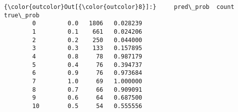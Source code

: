 \documentclass[11pt]{article}
\begin{document}
\begin{Verbatim}[commandchars=\\\{\}]
{\color{outcolor}Out[{\color{outcolor}8}]:}     pred\_prob  count  true\_prob
        0         0.0   1806   0.028239
        1         0.1    661   0.024206
        2         0.2    250   0.044000
        3         0.3    133   0.157895
        4         0.8     78   0.987179
        5         0.4     76   0.394737
        6         0.9     76   0.973684
        7         1.0     69   1.000000
        8         0.7     66   0.909091
        9         0.6     64   0.687500
        10        0.5     54   0.555556
\end{Verbatim}
            

    
    
    
    
\end{document}
